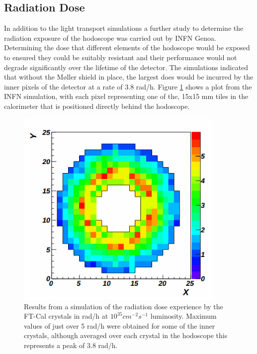 \subsection{Radiation Dose}

In addition to the light transport simulations a further study to determine the radiation exposure of the hodoscope was carried out by INFN Genoa. Determining the dose that different elements of the hodoscope would be exposed to ensured they could be suitably resistant and their performance would not degrade significantly over the lifetime of the detector. 
The simulations indicated that without the M\o{}ller shield in place, the largest does would be incurred by the inner pixels of the detector at a rate of 3.8 rad/h. Figure \ref{SimulationRadDose} shows a plot from the INFN simulation, with each pixel representing one of the, 15x15 mm tiles in the calorimeter that is positioned directly behind the hodoscope. 

\begin{figure}
	\centering
	\includegraphics[width=0.9\textwidth]{ImgChap1/raddose}
	\caption{Results from a simulation of the radiation dose experience by the FT-Cal crystals in rad/h at $10^{35}cm^{-2}s^{-1}$ luminosity. Maximum values of just over 5 rad/h were obtained for some of the inner crystals, although averaged over each crystal in the hodoscope this represents a peak of 3.8 rad/h. \cite{FTTDR2012}}
	\label{SimulationRadDose}
\end{figure}

